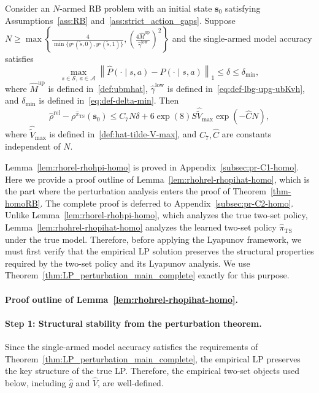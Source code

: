 \documentclass[mnsc,nonblindrev]{informs3}
\newcommand{\pihts}{\widehat{\pi}_{\mathrm{TS}}}
\newcommand{\bms}{\bm{s}}
\begin{document}
\begin{lemma}[Bound on $\widehat\rho^{\mathrm{rel}}-\rho^{\pihts}(\bms_0)$]\label{lem:rhohrel-rhopihat-homo}
Consider an $N$-armed RB problem with an initial state $\bms_0$ satisfying Assumptions~\ref{ass:RB} and~\ref{ass:strict_action_gaps}. Suppose
\(
N\ge \max\left\{\frac{4}{\min\{y^\star(\tilde{s},0),y^\star(\tilde{s},1)\}},\left(\frac{4\widehat M^{\mathrm{up}}}{\widehat\gamma^{\mathrm{low}}}\right)^2\right\}
\)
and the single-armed model accuracy satisfies
\[
\max_{s\in\mathcal S,\ a\in\mathcal A}\left\|\widehat P(\cdot\mid s,a)-P(\cdot\mid s,a)\right\|_1
\le \delta\le \delta_{\min},
\]
where $\widehat M^{\mathrm{up}}$ is defined in~\eqref{def:ubmhat}, $\widehat\gamma^{\mathrm{low}}$ is defined in~\eqref{eq:def-lbg-upg-ubKvh}, and $\delta_{\min}$ is defined in~\eqref{eq:def-delta-min}. Then
\[
\widehat\rho^{\mathrm{rel}}-\rho^{\pihts}(\bms_0)
\le C_7N\delta+6\exp(8)S\widehat{\widetilde V}_{\max}\exp(-\widehat C N),
\]
where $\widehat{\widetilde V}_{\max}$ is defined in~\eqref{def:hat-tilde-V-max}, and $C_7,\widehat C$ are constants independent of $N$.
\end{lemma}

Lemma~\ref{lem:rhorel-rhohpi-homo} is proved in Appendix~\ref{subsec:pr-C1-homo}. Here we provide a proof outline of Lemma~\ref{lem:rhohrel-rhopihat-homo},
which is the part where the perturbation analysis enters the proof of
Theorem~\ref{thm-homoRB}. The complete proof is deferred to
Appendix~\ref{subsec:pr-C2-homo}. Unlike
Lemma~\ref{lem:rhorel-rhohpi-homo}, which analyzes the true two-set policy,
Lemma~\ref{lem:rhohrel-rhopihat-homo} analyzes the learned two-set policy
\(\pihts\) under the true model. Therefore, before applying the Lyapunov
framework, we must first verify that the empirical LP solution preserves
the structural properties required by the two-set policy and its Lyapunov
analysis. We use Theorem~\ref{thm:LP_perturbation_main_complete} exactly for this purpose.
\paragraph{Proof outline of Lemma~\ref{lem:rhohrel-rhopihat-homo}.}

\paragraph{Step 1: Structural stability from the perturbation theorem.} Since the single-armed model accuracy satisfies the requirements of Theorem~\ref{thm:LP_perturbation_main_complete}, the empirical LP
preserves the key structure of the true LP. Therefore, the empirical two-set objects used below,
including \(\widehat g\) and \(\widehat V\), are well-defined.
\end{document}
